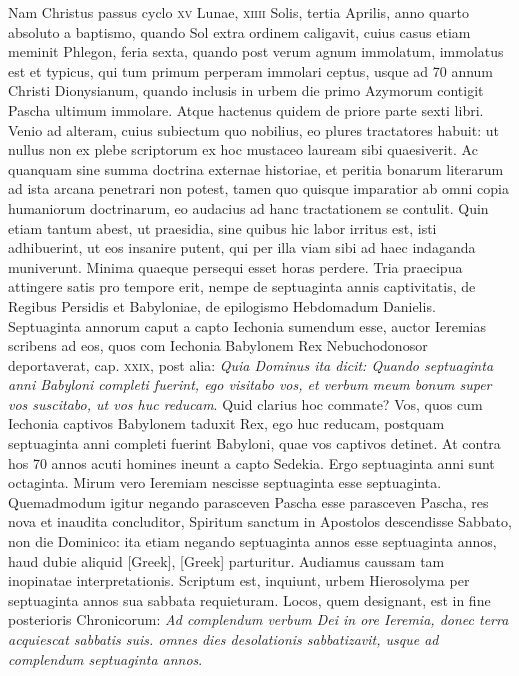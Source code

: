 \begin{parnumbers}
{}
\lnr{}Nam Christus passus cyclo \textsc{xv} Lunae, \textsc{xiiii} Solis,
 tertia Aprilis,
anno quarto absoluto a baptismo, quando Sol extra ordinem caligavit,
cuius casus etiam meminit Phlegon, feria sexta, quando
post verum agnum immolatum, immolatus est et typicus, qui tum
primum perperam immolari ceptus, usque ad 70 annum Christi
Dionysianum, quando inclusis in urbem die primo Azymorum
contigit Pascha ultimum immolare.
\lnr{}Atque hactenus quidem de
priore parte sexti libri.
\lnr{}Venio ad alteram, cuius subiectum quo nobilius,
eo plures tractatores habuit: ut nullus non ex plebe scriptorum
ex hoc mustaceo lauream sibi quaesiverit.
\lnr{}Ac quanquam sine
summa doctrina externae historiae, et peritia bonarum literarum
ad ista arcana penetrari non potest, tamen quo quisque imparatior
ab omni copia humaniorum doctrinarum, eo audacius ad hanc
tractationem se contulit.
\lnr{}Quin etiam tantum abest, ut praesidia,
sine quibus hic labor irritus est, isti adhibuerint, ut eos insanire
putent, qui per illa viam sibi ad haec indaganda muniverunt.
\lnr{}Minima quaeque persequi esset horas perdere.
\lnr{}Tria praecipua attingere
satis pro tempore erit, nempe de septuaginta annis captivitatis,
de Regibus Persidis et Babyloniae, de epilogismo Hebdomadum
Danielis.
\lnr{}Septuaginta annorum caput a capto Iechonia sumendum
esse, auctor Ieremias scribens ad eos, quos com Iechonia Babylonem
Rex Nebuchodonosor deportaverat, cap. \textsc{xxix}, post
alia: \textit{Quia Dominus ita dicit: Quando septuaginta anni Babyloni completi
fuerint, ego visitabo vos, et verbum meum bonum super vos
suscitabo, ut vos huc reducam}.
\lnr{}Quid clarius hoc commate?
\lnr{}Vos,
quos cum Iechonia captivos Babylonem taduxit Rex, ego huc
reducam, postquam septuaginta anni completi fuerint Babyloni,
quae vos captivos detinet.
\lnr{}At contra hos 70 annos acuti homines
ineunt a capto Sedekia.
\lnr{}Ergo septuaginta anni sunt octaginta.
\lnr{}Mirum vero Ieremiam nescisse septuaginta esse septuaginta.
\lnr{}Quemadmodum
igitur negando parasceven Pascha esse parasceven
Pascha, res nova et inaudita concluditor, Spiritum sanctum in 
Apostolos descendisse Sabbato, non die Dominico: ita etiam
negando septuaginta annos esse septuaginta annos, haud dubie
aliquid \textgreek{[Greek]}, \textgreek{[Greek]} parturitur.
\lnr{}Audiamus
caussam tam inopinatae interpretationis.
\lnr{}Scriptum est, inquiunt, urbem
Hierosolyma per septuaginta annos sua sabbata requieturam.
\lnr{}Locos, quem designant, est in fine posterioris Chronicorum:
\textit{Ad complendum verbum Dei in ore Ieremia,
 donec terra acquiescat sabbatis
suis. omnes dies desolationis sabbatizavit, usque ad complendum
septuaginta annos}.


\end{parnumbers}
